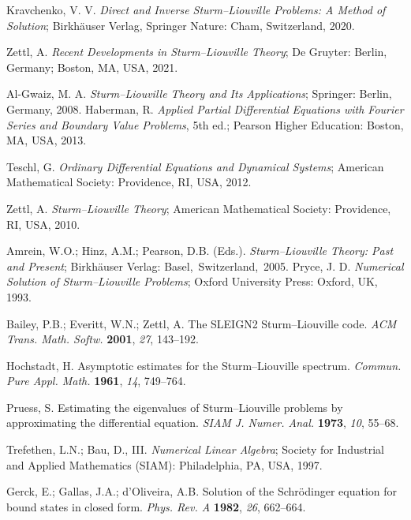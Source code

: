 \documentclass[symmetry,article,accept,moreauthors,pdftex,a4paper]{mdpi}
\begin{document}
\begin{thebibliography}{99}

 Kravchenko, V. V.  \textit{Direct and Inverse Sturm--Liouville Problems: A Method of Solution}; Birkhäuser Verlag, Springer Nature: Cham, Switzerland, 2020.

 Zettl, A. \textit{Recent Developments in Sturm--Liouville Theory}; De Gruyter: Berlin, Germany; Boston, MA, USA, 2021.

 Al-Gwaiz, M. A. \textit{Sturm--Liouville Theory and Its Applications}; Springer: Berlin, Germany, 2008.
 Haberman, R. \textit{Applied Partial Differential Equations with Fourier Series and Boundary Value Problems}, 5th ed.; Pearson Higher Education: Boston, MA, USA, 2013.

 Teschl, G. \textit{Ordinary Differential Equations and Dynamical Systems}; American Mathematical Society: Providence, RI, USA, 2012.

 Zettl, A. \textit{Sturm--Liouville Theory}; American Mathematical Society: Providence, RI, USA, 2010.

 Amrein, W.O.; Hinz, A.M.; Pearson, D.B. (Eds.). \textit{Sturm--Liouville Theory: Past and Present}; Birkhäuser Verlag: \mbox{Basel, Switzerland, 2005.}
 Pryce, J. D. \textit{Numerical Solution of Sturm--Liouville Problems}; Oxford University Press: Oxford, UK, 1993.

 Bailey, P.B.; Everitt, W.N.; Zettl, A. The SLEIGN2 Sturm--Liouville code. \textit{ACM Trans. Math. Softw.} \textbf{2001}, \emph{27}, 143--192. 

 Hochstadt, H. Asymptotic estimates for the Sturm--Liouville spectrum. \textit{Commun. Pure Appl. Math.} \textbf{1961}, \emph{14}, 749--764.

 Pruess, S. Estimating the eigenvalues of Sturm--Liouville problems by approximating the differential equation. \textit{SIAM J. Numer. Anal.} \textbf{1973}, {\emph{10}}, 55--68.

 Trefethen, L.N.; Bau, D., III. \textit{Numerical Linear Algebra}; Society for Industrial and Applied Mathematics (SIAM): Philadelphia, PA, USA, 1997.

 Gerck, E.; Gallas, J.A.; d'Oliveira, A.B. Solution of the Schrödinger equation for bound states in closed form. \textit{Phys. Rev. A} \textbf{1982}, \emph{26}, 662--664.


\end{thebibliography}
\end{document}
